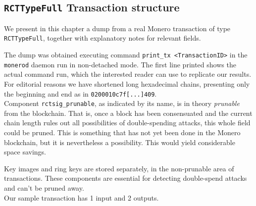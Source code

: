 

\begin{appendices}

\renewcommand{\theFancyVerbLine}{%
	\textcolor{red}{\small
		\arabic{FancyVerbLine}}}
	
	
\chapter{{\tt RCTTypeFull} Transaction structure}
\label{appendix:RCTTypeFull}

We present in this chapter a dump from a real Monero transaction of type {\tt RCTTypeFull}, 
together with explanatory notes for relevant fields.

The dump was obtained executing command {\tt print\_tx <TransactionID>} in the {\tt monerod} daemon run in non-detached mode. The first line printed shows the actual command run, which the interested reader can use to replicate our results.
\\

For editorial reasons we have shortened long hexadecimal chains, presenting only the beginning and end as in {\tt 0200010c7f[...]409}.
\\

Component {\tt rctsig\_prunable}, as indicated by its name, is in theory {\sl prunable} from the blockchain. That is, once a block has been consensuated and the current chain length rules out all possibilities of double-spending attacks, this whole field could be pruned. This is something that has not yet been done in the Monero blockchain, but it is nevertheless a possibility. This would yield considerable space savings. 

Key images and ring keys are stored separately, in the non-prunable area of transactions. These components are essential for detecting double-spend attacks and can’t be pruned away.
\\

Our sample transaction has 1 input and 2 outputs.



\end{appendices}
